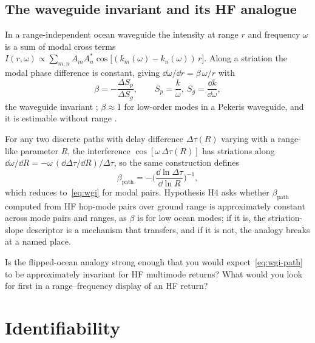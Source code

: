 \subsection[The waveguide invariant and its HF analogue]{The waveguide invariant and its HF analogue\hfill{\normalfont\small \tagH{}}}
\label{sec:wgi}

In a range-independent ocean waveguide the intensity at range $r$ and frequency $\omega$ is a sum of modal cross terms $I(r,\omega)\propto\sum_{m,n}A_mA_n^\ast\cos\big[(k_m(\omega)-k_n(\omega))\,r\big]$. Along a striation the modal phase difference is constant, giving $\dd\omega/\dd r=\beta\,\omega/r$ with
\begin{equation}
  \beta = -\frac{\Delta S_p}{\Delta S_g},\qquad S_p=\frac{k}{\omega},\ S_g=\frac{\dd k}{\dd\omega},
  \label{eq:wgi}
\end{equation}
the waveguide invariant \citep{dspain1999}; $\beta\approx1$ for low-order modes in a Pekeris waveguide, and it is estimable without range \citep{rouseff2011,cockrell2010,jang2024}.

For any two discrete paths with delay difference $\Delta\tau(R)$ varying with a range-like parameter $R$, the interference $\cos[\omega\,\Delta\tau(R)]$ has striations along $\dd\omega/\dd R=-\omega\,(\dd\Delta\tau/\dd R)/\Delta\tau$, so the same construction defines
\begin{equation}
  \beta_{\mathrm{path}} = -\Big(\frac{\dd\ln\Delta\tau}{\dd\ln R}\Big)^{-1},
  \label{eq:wgi-path}
\end{equation}
which reduces to~\eqref{eq:wgi} for modal pairs. Hypothesis H4 asks whether $\beta_{\mathrm{path}}$ computed from HF hop-mode pairs over ground range is approximately constant across mode pairs and ranges, as $\beta$ is for low ocean modes; if it is, the striation-slope descriptor is a mechanism that transfers, and if it is not, the analogy breaks at a named place.

\begin{question}
Is the flipped-ocean analogy strong enough that you would expect~\eqref{eq:wgi-path} to be approximately invariant for HF multimode returns? What would you look for first in a range--frequency display of an HF return?
\end{question}

\section{Identifiability}
\label{sec:ident}

